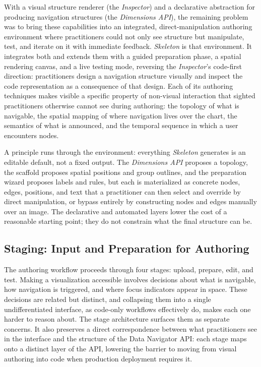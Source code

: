 \documentclass[12pt]{cmuthesis}
\begin{document}
With a visual structure renderer (the \textit{Inspector}) and a declarative abstraction for producing navigation structures (the \textit{Dimensions API}), the remaining problem was to bring these capabilities into an integrated, direct-manipulation authoring environment where practitioners could not only see structure but manipulate, test, and iterate on it with immediate feedback. \textit{Skeleton} is that environment. It integrates both and extends them with a guided preparation phase, a spatial rendering canvas, and a live testing mode, reversing the \textit{Inspector}'s code-first direction: practitioners design a navigation structure visually and inspect the code representation as a consequence of that design. Each of its authoring techniques makes visible a specific property of non-visual interaction that sighted practitioners otherwise cannot see during authoring: the topology of what is navigable, the spatial mapping of where navigation lives over the chart, the semantics of what is announced, and the temporal sequence in which a user encounters nodes.

A principle runs through the environment: everything \textit{Skeleton} generates is an editable default, not a fixed output. The \textit{Dimensions API} proposes a topology, the scaffold proposes spatial positions and group outlines, and the preparation wizard proposes labels and rules, but each is materialized as concrete nodes, edges, positions, and text that a practitioner can then select and override by direct manipulation, or bypass entirely by constructing nodes and edges manually over an image. The declarative and automated layers lower the cost of a reasonable starting point; they do not constrain what the final structure can be.

\subsection{Staging: Input and Preparation for Authoring}

The authoring workflow proceeds through four stages: upload, prepare, edit, and test. Making a visualization accessible involves decisions about what is navigable, how navigation is triggered, and where focus indicators appear in space. These decisions are related but distinct, and collapsing them into a single undifferentiated interface, as code-only workflows effectively do, makes each one harder to reason about. The stage architecture surfaces them as separate concerns. It also preserves a direct correspondence between what practitioners see in the interface and the structure of the Data Navigator API: each stage maps onto a distinct layer of the API, lowering the barrier to moving from visual authoring into code when production deployment requires it.
\end{document}

